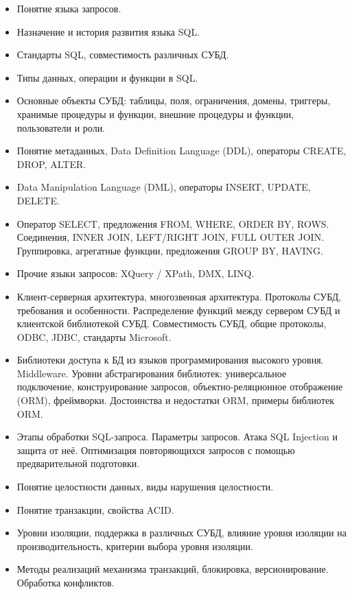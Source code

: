 \documentclass[a4paper]{article}
\begin{document}
\begin{itemize}
  \item Понятие языка запросов.
  \item Назначение и история развития языка SQL.
  \item Стандарты SQL, совместимость различных СУБД.
  \item Типы данных, операции и функции в SQL.
  \item Основные объекты СУБД: таблицы, поля, ограничения, домены, триггеры,
    хранимые процедуры и функции, внешние процедуры и функции, пользователи и роли.
  \item Понятие метаданных, Data Definition Language (DDL), операторы CREATE, DROP, ALTER.
  \item Data Manipulation Language (DML), операторы INSERT, UPDATE, DELETE.
  \item Оператор SELECT, предложения FROM, WHERE, ORDER BY, ROWS.
    Соединения, INNER JOIN, LEFT/RIGHT JOIN, FULL OUTER JOIN. Группировка, агрегатные функции, предложения GROUP BY, HAVING.
  \item Прочие языки запросов: XQuery / XPath, DMX, LINQ.
\end{itemize}

\begin{itemize}
  \item Клиент-серверная архитектура, многозвенная архитектура. Протоколы СУБД, требования и особенности.
    Распределение функций между сервером СУБД и клиентской библиотекой СУБД.
    Совместимость СУБД, общие протоколы, ODBC, JDBC, стандарты Microsoft.
  \item Библиотеки доступа к БД из языков программирования высокого уровня. Middleware.
    Уровни абстрагирования библиотек: универсальное подключение, конструирование запросов,
    объект\-но-реля\-цион\-ное отображение (ORM), фреймворки. Достоинства и недостатки ORM, примеры библиотек ORM.
  \item Этапы обработки SQL-запроса. Параметры запросов. Атака SQL Injection и защита от неё.
    Оптимизация повторяющихся запросов с помощью предварительной подготовки.
\end{itemize}

\begin{itemize}
  \item Понятие целостности данных, виды нарушения целостности.
  \item Понятие транзакции, свойства ACID.
  \item Уровни изоляции, поддержка в различных СУБД,
    влияние уровня изоляции на производительность, критерии выбора уровня изоляции.
  \item Методы реализаций механизма транзакций, блокировка, версионирование. Обработка конфликтов.
\end{itemize}
\end{document}
